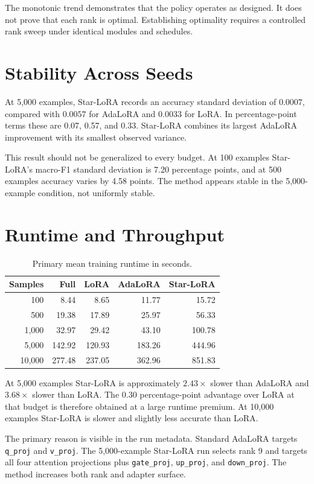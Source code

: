 The monotonic trend demonstrates that the policy operates as designed. It does not prove that each
rank is optimal. Establishing optimality requires a controlled rank sweep under identical modules
and schedules.

\section{Stability Across Seeds}

At 5,000 examples, Star-LoRA records an accuracy standard deviation of $0.0007$, compared with
$0.0057$ for AdaLoRA and $0.0033$ for LoRA. In percentage-point terms these are 0.07, 0.57, and
0.33. Star-LoRA combines its largest AdaLoRA improvement with its smallest observed variance.

This result should not be generalized to every budget. At 100 examples Star-LoRA's macro-F1
standard deviation is 7.20 percentage points, and at 500 examples accuracy varies by 4.58 points.
The method appears stable in the 5,000-example condition, not uniformly stable.

\section{Runtime and Throughput}

\begin{table}[H]
\centering
\caption{Primary mean training runtime in seconds.}
\label{tab:runtime}
\begin{tabular}{@{}rrrrr@{}}
\toprule
Samples & Full & LoRA & AdaLoRA & Star-LoRA \\
\midrule
100 & 8.44 & 8.65 & 11.77 & 15.72 \\
500 & 19.38 & 17.89 & 25.97 & 56.33 \\
1,000 & 32.97 & 29.42 & 43.10 & 100.78 \\
5,000 & 142.92 & 120.93 & 183.26 & 444.96 \\
10,000 & 277.48 & 237.05 & 362.96 & 851.83 \\
\bottomrule
\end{tabular}
\end{table}

At 5,000 examples Star-LoRA is approximately $2.43\times$ slower than AdaLoRA and
$3.68\times$ slower than LoRA. The 0.30 percentage-point advantage over LoRA at that budget is
therefore obtained at a large runtime premium. At 10,000 examples Star-LoRA is slower and slightly
less accurate than LoRA.

The primary reason is visible in the run metadata. Standard AdaLoRA targets
\texttt{q\_proj} and \texttt{v\_proj}. The 5,000-example Star-LoRA run selects rank 9 and targets
all four attention projections plus \texttt{gate\_proj}, \texttt{up\_proj}, and
\texttt{down\_proj}. The method increases both rank and adapter surface.

